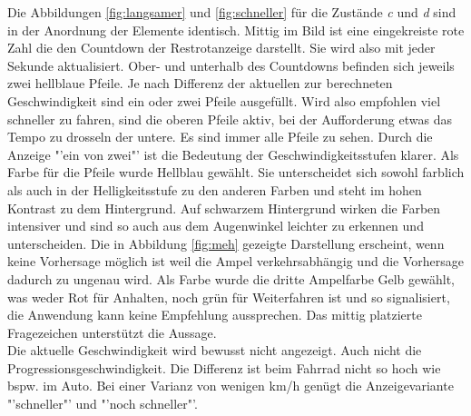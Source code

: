 Die Abbildungen \ref{fig:langsamer} und \ref{fig:schneller} für die Zustände \textit{c} und \textit{d} sind in der Anordnung der Elemente identisch. Mittig im Bild ist eine eingekreiste rote Zahl die den Countdown der Restrotanzeige darstellt. Sie wird also mit jeder Sekunde aktualisiert. Ober- und unterhalb des Countdowns befinden sich jeweils zwei hellblaue Pfeile. Je nach Differenz der aktuellen zur berechneten Geschwindigkeit sind ein oder zwei Pfeile ausgefüllt. Wird also empfohlen viel schneller zu fahren, sind die oberen Pfeile aktiv, bei der Aufforderung etwas das Tempo zu drosseln der untere. Es sind immer alle Pfeile zu sehen. Durch die Anzeige "'ein von zwei"' ist die Bedeutung der Geschwindigkeitsstufen klarer. Als Farbe für die Pfeile wurde Hellblau gewählt. Sie unterscheidet sich sowohl farblich als auch in der Helligkeitsstufe zu den anderen Farben und steht im hohen Kontrast zu dem Hintergrund. Auf schwarzem Hintergrund wirken die Farben intensiver und sind so auch aus dem Augenwinkel leichter zu erkennen und unterscheiden. Die in Abbildung \ref{fig:meh} gezeigte Darstellung erscheint, wenn keine Vorhersage möglich ist weil die Ampel verkehrsabhängig und die Vorhersage dadurch zu ungenau wird. Als Farbe wurde die dritte Ampelfarbe Gelb gewählt, was weder Rot für Anhalten, noch grün für Weiterfahren ist und so signalisiert, die Anwendung kann keine Empfehlung aussprechen. Das mittig platzierte Fragezeichen unterstützt die Aussage.\\
Die aktuelle Geschwindigkeit wird bewusst nicht angezeigt. Auch nicht die Progressionsgeschwindigkeit. Die Differenz ist beim Fahrrad nicht so hoch wie bspw. im Auto. Bei einer Varianz von wenigen km/h genügt die Anzeigevariante "'schneller"' und "'noch schneller"'.
